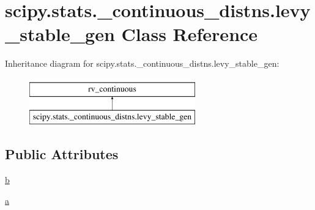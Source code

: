 \hypertarget{classscipy_1_1stats_1_1__continuous__distns_1_1levy__stable__gen}{}\section{scipy.\+stats.\+\_\+continuous\+\_\+distns.\+levy\+\_\+stable\+\_\+gen Class Reference}
\label{classscipy_1_1stats_1_1__continuous__distns_1_1levy__stable__gen}
Inheritance diagram for scipy.\+stats.\+\_\+continuous\+\_\+distns.\+levy\+\_\+stable\+\_\+gen\+:\begin{figure}[H]
\begin{center}
\leavevmode
\includegraphics[height=2.000000cm]{classscipy_1_1stats_1_1__continuous__distns_1_1levy__stable__gen}
\end{center}
\end{figure}
\subsection*{Public Attributes}
\begin{DoxyCompactItemize}
\item 
\hyperlink{classscipy_1_1stats_1_1__continuous__distns_1_1levy__stable__gen_abf35e80bf98159ac580db1192226425c}{b}
\item 
\hyperlink{classscipy_1_1stats_1_1__continuous__distns_1_1levy__stable__gen_ac5aea5a880f5a6810cc583d1bc423530}{a}
\end{DoxyCompactItemize}


